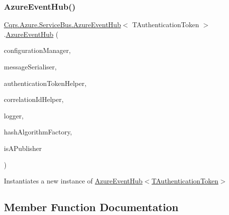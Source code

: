 \subsubsection{\texorpdfstring{Azure\+Event\+Hub()}{AzureEventHub()}}
{\footnotesize\ttfamily \hyperlink{classCqrs_1_1Azure_1_1ServiceBus_1_1AzureEventHub}{Cqrs.\+Azure.\+Service\+Bus.\+Azure\+Event\+Hub}$<$ T\+Authentication\+Token $>$.\hyperlink{classCqrs_1_1Azure_1_1ServiceBus_1_1AzureEventHub}{Azure\+Event\+Hub} (\begin{DoxyParamCaption}\item[{\hyperlink{interfaceCqrs_1_1Configuration_1_1IConfigurationManager}{I\+Configuration\+Manager}}]{configuration\+Manager,  }\item[{\hyperlink{interfaceCqrs_1_1Azure_1_1ServiceBus_1_1IMessageSerialiser}{I\+Message\+Serialiser}$<$ T\+Authentication\+Token $>$}]{message\+Serialiser,  }\item[{\hyperlink{interfaceCqrs_1_1Authentication_1_1IAuthenticationTokenHelper}{I\+Authentication\+Token\+Helper}$<$ T\+Authentication\+Token $>$}]{authentication\+Token\+Helper,  }\item[{I\+Correlation\+Id\+Helper}]{correlation\+Id\+Helper,  }\item[{I\+Logger}]{logger,  }\item[{\hyperlink{interfaceCqrs_1_1Bus_1_1IHashAlgorithmFactory}{I\+Hash\+Algorithm\+Factory}}]{hash\+Algorithm\+Factory,  }\item[{bool}]{is\+A\+Publisher }\end{DoxyParamCaption})\hspace{0.3cm}{\ttfamily [protected]}}



Instantiates a new instance of \hyperlink{classCqrs_1_1Azure_1_1ServiceBus_1_1AzureEventHub_a2b548165ac5b1e3d0312af5c62e3c6cd_a2b548165ac5b1e3d0312af5c62e3c6cd}{Azure\+Event\+Hub$<$\+T\+Authentication\+Token$>$} 



\subsection{Member Function Documentation}
\mbox{\label{classCqrs_1_1Azure_1_1ServiceBus_1_1AzureEventHub_af2efc497815828b6fe0b4d6621bc8b41_af2efc497815828b6fe0b4d6621bc8b41}} 
